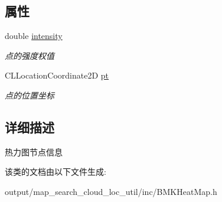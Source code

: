 \subsection*{属性}
\begin{DoxyCompactItemize}
\item 
\hypertarget{interface_b_m_k_heat_map_node_ac1ab14f83204a0e5f4a16180acc30742}{double \hyperlink{interface_b_m_k_heat_map_node_ac1ab14f83204a0e5f4a16180acc30742}{intensity}}\label{interface_b_m_k_heat_map_node_ac1ab14f83204a0e5f4a16180acc30742}

\begin{DoxyCompactList}\small\item\em 点的强度权值 \end{DoxyCompactList}\item 
\hypertarget{interface_b_m_k_heat_map_node_a7dcd370e65e376d8253e9a9d127dc984}{C\+L\+Location\+Coordinate2\+D \hyperlink{interface_b_m_k_heat_map_node_a7dcd370e65e376d8253e9a9d127dc984}{pt}}\label{interface_b_m_k_heat_map_node_a7dcd370e65e376d8253e9a9d127dc984}

\begin{DoxyCompactList}\small\item\em 点的位置坐标 \end{DoxyCompactList}\end{DoxyCompactItemize}


\subsection{详细描述}
热力图节点信息 

该类的文档由以下文件生成\+:\begin{DoxyCompactItemize}
\item 
output/map\+\_\+search\+\_\+cloud\+\_\+loc\+\_\+util/inc/B\+M\+K\+Heat\+Map.\+h\end{DoxyCompactItemize}
